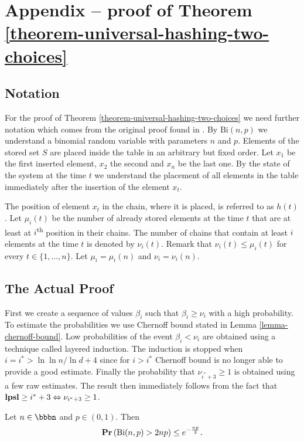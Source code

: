 \section*{Appendix -- proof of Theorem \ref{theorem-universal-hashing-two-choices}}
\subsection{Notation}
For the proof of Theorem \ref{theorem-universal-hashing-two-choices} we need further notation which comes from the original proof found in \cite{Mitzenmacher:2005:PCR:1076315}. By $\mathrm{Bi}(n, p)$ we understand a binomial random variable with parameters $n$ and $p$. Elements of the stored set $S$ are placed inside the table in an arbitrary but fixed order. Let $x_1$ be the first inserted element, $x_2$ the second and $x_n$ be the last one. By the state of the system at the time $t$ we understand the placement of all elements in the table immediately after the insertion of the element $x_t$. 

The position of element $x_t$ in the chain, where it is placed, is referred to as $h(t)$. Let $\mu_i(t)$ be the number of already stored elements at the time $t$ that are at least at $i$\textsuperscript{th} position in their chains. The number of chains that contain at least $i$ elements at the time $t$ is denoted by $\nu_i(t)$. Remark that $\nu_i(t) \leq \mu_i(t)$ for every $t \in \{1, \dots, n \}$. Let $\mu_i = \mu_i(n)$ and $\nu_i = \nu_i(n)$.

\subsection{The Actual Proof}
First we create a sequence of values $\beta_i$ such that $\beta_i \geq \nu_i$ with a high probability. To estimate the probabilities we use Chernoff bound stated in Lemma \ref{lemma-chernoff-bound}. Low probabilities of the event $\beta_i < \nu_i$ are obtained using a technique called layered induction. The induction is stopped when $i = i^* > \ln \ln n/\ln d + 4$ since for $i > i^*$ Chernoff bound is no longer able to provide a good estimate. Finally the probability that $\nu_{i^*+3} \geq 1$ is obtained using a few raw estimates. The result then immediately follows from the fact that $\mathbf{lpsl} \geq i^*+3 \Leftrightarrow \nu_{i^* + 3} \geq 1$.

\begin{lemma}
\label{lemma-chernoff-bound}
Let $n \in \bbbn$ and $p \in (0, 1)$. Then $$\mathbf{Pr}\left(\mathrm{Bi}(n, p) > 2np\right) \leq e ^ {- \frac{np}{3}} \textit{.}$$
\end{lemma}

